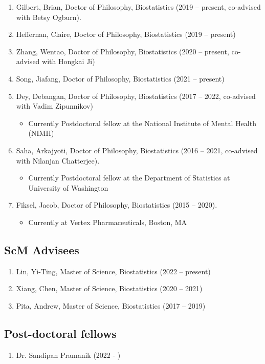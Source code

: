 \documentclass[12pt]{article}
\newcommand{\myben}[1]{\smallskip\begin{enumerate}[start=1,label={\scriptsize \arabic*$\ $},leftmargin=\parindent]\setlength{\itemsep}{#1}\vspace*{-0.7em}}
\newcommand{\ee}{\end{enumerate}}
\begin{document}
\myben{-0.1em}
\item Gilbert, Brian, Doctor of Philosophy, Biostatistics (2019 -- present, co-advised with Betsy Ogburn).
\item Heffernan, Claire, Doctor of Philosophy, Biostatistics (2019 -- present)
\item Zhang, Wentao, Doctor of Philosophy, Biostatistics (2020 -- present, co-advised with Hongkai Ji)
\item Song, Jiafang, Doctor of Philosophy, Biostatistics (2021 -- present)
\item Dey, Debangan, Doctor of Philosophy, Biostatistics (2017 -- 2022, co-advised with Vadim Zipunnikov)
\begin{itemize}
	\item Currently Postdoctoral fellow at the National Institute of Mental Health (NIMH)
\end{itemize}
\item Saha, Arkajyoti, Doctor of Philosophy, Biostatistics (2016 -- 2021, co-advised with Nilanjan Chatterjee).
\begin{itemize}
	\item Currently Postdoctoral fellow at the Department of Statistics at University of Washington
\end{itemize}
\item Fiksel, Jacob, Doctor of Philosophy, Biostatistics (2015 -- 2020).
\begin{itemize}
	\item Currently at Vertex Pharmaceuticals, Boston, MA
\end{itemize}

\ee

\subsection*{ScM Advisees}

\myben{-0.1em}
\item Lin, Yi-Ting, Master of Science, Biostatistics (2022 -- present)
\item Xiang, Chen, Master of Science, Biostatistics (2020 -- 2021)
\item Pita, Andrew, Master of Science, Biostatistics (2017 -- 2019)
\ee

\subsection*{Post-doctoral fellows}
\myben{-0.1em}
\item Dr. Sandipan Pramanik (2022 - )
\ee
\end{document}
